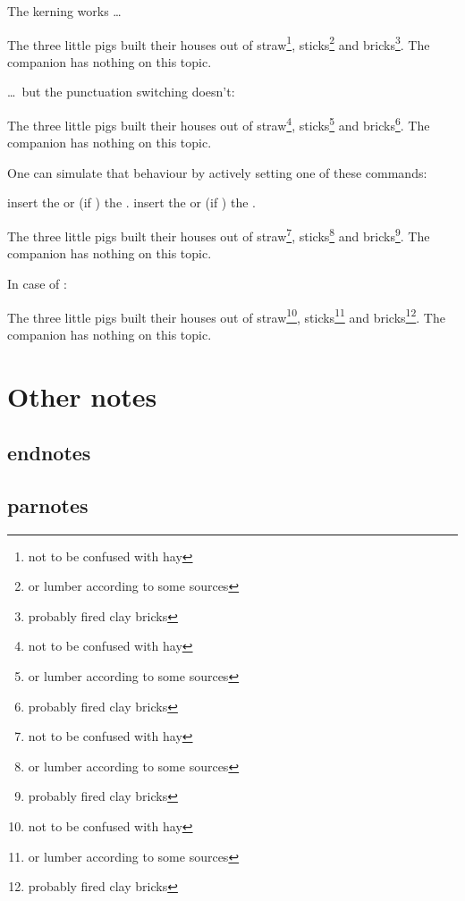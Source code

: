 \documentclass[toc=index,toc=bib]{cnpkgdoc}
\begin{document}
The kerning works \ldots
\begin{beispiel}
 \begin{minipage}{.5\linewidth}
  \noindent The three little pigs built their houses
  out of straw\footnote{not to be confused with hay},
  sticks\footnote{or lumber according to some sources}
  and bricks\footnote{probably fired clay bricks}. The
  companion has nothing on this
  topic.
 \end{minipage}
\end{beispiel}

\ldots\ but the punctuation switching doesn't:
\begin{beispiel}
 \begin{minipage}{.5\linewidth}
  \noindent The three little pigs built their houses
  out of straw\footnote{not to be confused with hay},
  sticks\footnote{or lumber according to some sources}
  and bricks\footnote{probably fired clay bricks}. The
  companion has nothing on this topic.
 \end{minipage}
\end{beispiel}

One can simulate that behaviour by actively setting one of these commands:
\begin{beschreibung}
  insert the  or (if )
 the .
  insert the  or (if )
 the .
\end{beschreibung}
\begin{beispiel}
 \begin{minipage}{.5\linewidth}
  \noindent The three little pigs built their houses
  out of straw\footnote{not to be confused with hay},
  sticks\footnote{or lumber according to some sources}
  and bricks\footnote{probably fired clay bricks}. The
  companion has nothing on this topic.\kfp{}
 \end{minipage}
\end{beispiel}

In case of :
\begin{beispiel}
 \begin{minipage}{.5\linewidth}
  \noindent The three little pigs built their houses
  out of straw\footnote{not to be confused with hay},
  sticks\footnote{or lumber according to some sources}
  and bricks\footnote{probably fired clay bricks}. The
  companion has nothing on this topic\kfp.
 \end{minipage}
\end{beispiel}

\section{Other notes}
\subsection{endnotes}

\subsection{parnotes}


\appendix
\printbibliography
\printindex
\end{document}
